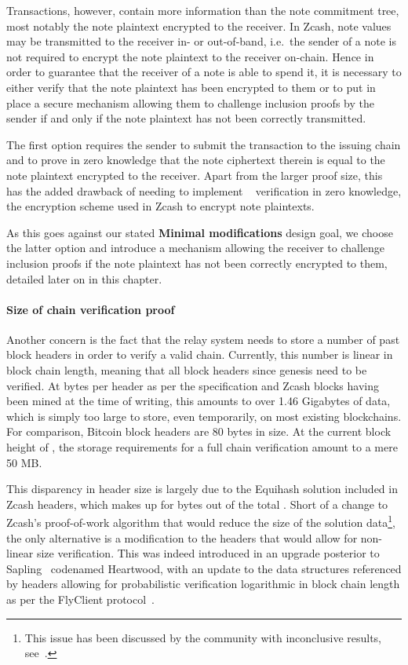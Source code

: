 Transactions, however, contain more information than the note commitment tree, most notably the note plaintext encrypted to the receiver.
In Zcash, note values may be transmitted to the receiver in- or out-of-band, i.e.\ the sender of a note is not required to encrypt the note plaintext to the receiver on-chain.
Hence in order to guarantee that the receiver of a note is able to spend it, it is necessary to either verify that the note plaintext has been encrypted to them or to put in place a secure mechanism allowing them to challenge inclusion proofs by the sender if and only if the note plaintext has not been correctly transmitted.

The first option requires the sender to submit the transaction to the issuing chain and to prove in zero knowledge that the note ciphertext therein is equal to the note plaintext encrypted to the receiver.
Apart from the larger proof size, this has the added drawback of needing to implement \aead~\cite{rfc7539chacha20} verification in zero knowledge, the encryption scheme used in Zcash to encrypt note plaintexts.

As this goes against our stated \textbf{Minimal modifications} design goal, we choose the latter option and introduce a mechanism allowing the receiver to challenge inclusion proofs if the note plaintext has not been correctly encrypted to them, detailed later on in this chapter.

\paragraph{Size of chain verification proof}
\label{sec:verification_size}
Another concern is the fact that the relay system needs to store a number of past block headers in order to verify a valid chain.
Currently, this number is linear in block chain length, meaning that all block headers since genesis need to be verified.
At  bytes per header as per the specification and  Zcash blocks having been mined at the time of writing, this amounts to over 1.46 Gigabytes of data, which is simply too large to store, even temporarily, on most existing blockchains.
For comparison, Bitcoin block headers are 80 bytes in size.
At the current block height of , the storage requirements for a full chain verification amount to a mere 50 MB.

This disparency in header size is largely due to the Equihash solution included in Zcash headers, which makes up for  bytes out of the total .
Short of a change to Zcash's proof-of-work algorithm that would reduce the size of the solution data\footnote{This issue has been discussed by the community with inconclusive results, see~\cite{powzcashGithub}.}, the only alternative is a modification to the headers that would allow for non-linear size verification.
This was indeed introduced in an upgrade posterior to Sapling~\cite{zipszip0221flyclient} codenamed Heartwood, with an update to the data structures referenced by headers allowing for probabilistic verification logarithmic in block chain length as per the FlyClient protocol~\cite{buenz2020flyclient}.

